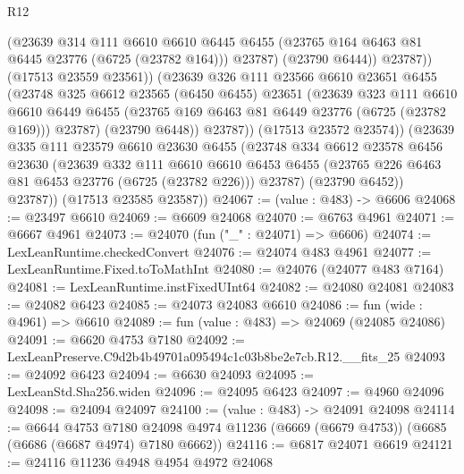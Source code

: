 \begin{lexlean}{R12}
\begin{coremodule}
                    (@23639
                      @314
                      @111
                      @6610
                      @6610
                      @6445
                      @6455
                      (@23765 @164 @6463 @81 @6445 @23776 (@6725 (@23782 @164)))
                      @23787)
                    (@23790 @6444))
                  @23787))
              (@17513 @23559 @23561))
            (@23639
              @326
              @111
              @23566
              @6610
              @23651
              @6455
              (@23748
                @325
                @6612
                @23565
                (@6450 @6455)
                @23651
                (@23639
                  @323
                  @111
                  @6610
                  @6610
                  @6449
                  @6455
                  (@23765 @169 @6463 @81 @6449 @23776 (@6725 (@23782 @169)))
                  @23787)
                (@23790 @6448))
              @23787))
          (@17513 @23572 @23574))
        (@23639
          @335
          @111
          @23579
          @6610
          @23630
          @6455
          (@23748
            @334
            @6612
            @23578
            @6456
            @23630
            (@23639
              @332
              @111
              @6610
              @6610
              @6453
              @6455
              (@23765 @226 @6463 @81 @6453 @23776 (@6725 (@23782 @226)))
              @23787)
            (@23790 @6452))
          @23787))
      (@17513 @23585 @23587))
@24067 := (value : @483) -> @6606
@24068 := @23497 @6610
@24069 := @6609 @24068
@24070 := @6763 @4961
@24071 := @6667 @4961
@24073 := @24070 (fun ("_" : @24071) => @6606)
@24074 := LexLeanRuntime.checkedConvert
@24076 := @24074 @483 @4961
@24077 := LexLeanRuntime.Fixed.toToMathInt
@24080 := @24076 (@24077 @483 @7164)
@24081 := LexLeanRuntime.instFixedUInt64
@24082 := @24080 @24081
@24083 := @24082 @6423
@24085 := @24073 @24083 @6610
@24086 := fun (wide : @4961) => @6610
@24089 := fun (value : @483) => @24069 (@24085 @24086)
@24091 := @6620 @4753 @7180
@24092 := LexLeanPreserve.C9d2b4b49701a095494c1c03b8be2e7cb.R12.__fits_25
@24093 := @24092 @6423
@24094 := @6630 @24093
@24095 := LexLeanStd.Sha256.widen
@24096 := @24095 @6423
@24097 := @4960 @24096
@24098 := @24094 @24097
@24100 := (value : @483) -> @24091 @24098
@24114 := @6644
    @4753
    @7180
    @24098
    @4974
    @11236
    (@6669 (@6679 @4753))
    (@6685 (@6686 (@6687 @4974) @7180 @6662))
@24116 := @6817 @24071 @6619
@24121 := @24116 @11236 @4948 @4954 @4972 @24068

\end{coremodule}
\end{lexlean}
